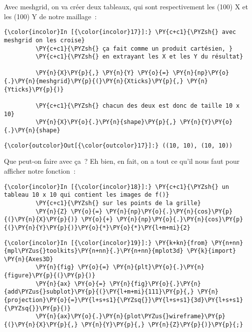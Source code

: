     Avec meshgrid, on va créer deux tableaux, qui sont respectivement les
(100) X et les (100) Y de notre maillage~:

    \begin{Verbatim}[commandchars=\\\{\},frame=single,framerule=0.3mm,rulecolor=\color{cellframecolor}]
{\color{incolor}In [{\color{incolor}17}]:} \PY{c+c1}{\PYZsh{} avec meshgrid on les croise}
         \PY{c+c1}{\PYZsh{} ça fait comme un produit cartésien, }
         \PY{c+c1}{\PYZsh{} en extrayant les X et les Y du résultat}
         
         \PY{n}{X}\PY{p}{,} \PY{n}{Y} \PY{o}{=} \PY{n}{np}\PY{o}{.}\PY{n}{meshgrid}\PY{p}{(}\PY{n}{Xticks}\PY{p}{,} \PY{n}{Yticks}\PY{p}{)}
         
         \PY{c+c1}{\PYZsh{} chacun des deux est donc de taille 10 x 10}
         \PY{n}{X}\PY{o}{.}\PY{n}{shape}\PY{p}{,} \PY{n}{Y}\PY{o}{.}\PY{n}{shape}
\end{Verbatim}


\begin{Verbatim}[commandchars=\\\{\},frame=single,framerule=0.3mm,rulecolor=\color{cellframecolor}]
{\color{outcolor}Out[{\color{outcolor}17}]:} ((10, 10), (10, 10))
\end{Verbatim}
            
    Que peut-on faire avec ça~? Eh bien, en fait, on a tout ce qu'il nous
faut pour afficher notre fonction~:

    \begin{Verbatim}[commandchars=\\\{\},frame=single,framerule=0.3mm,rulecolor=\color{cellframecolor}]
{\color{incolor}In [{\color{incolor}18}]:} \PY{c+c1}{\PYZsh{} un tableau 10 x 10 qui contient les images de f()}
         \PY{c+c1}{\PYZsh{} sur les points de la grille}
         \PY{n}{Z} \PY{o}{=} \PY{n}{np}\PY{o}{.}\PY{n}{cos}\PY{p}{(}\PY{n}{X}\PY{p}{)} \PY{o}{+} \PY{n}{np}\PY{o}{.}\PY{n}{cos}\PY{p}{(}\PY{n}{Y}\PY{p}{)}\PY{o}{*}\PY{o}{*}\PY{l+m+mi}{2}
\end{Verbatim}


    \begin{Verbatim}[commandchars=\\\{\},frame=single,framerule=0.3mm,rulecolor=\color{cellframecolor}]
{\color{incolor}In [{\color{incolor}19}]:} \PY{k+kn}{from} \PY{n+nn}{mpl\PYZus{}toolkits}\PY{n+nn}{.}\PY{n+nn}{mplot3d} \PY{k}{import} \PY{n}{Axes3D}
         \PY{n}{fig} \PY{o}{=} \PY{n}{plt}\PY{o}{.}\PY{n}{figure}\PY{p}{(}\PY{p}{)}
         \PY{n}{ax} \PY{o}{=} \PY{n}{fig}\PY{o}{.}\PY{n}{add\PYZus{}subplot}\PY{p}{(}\PY{l+m+mi}{111}\PY{p}{,} \PY{n}{projection}\PY{o}{=}\PY{l+s+s1}{\PYZsq{}}\PY{l+s+s1}{3d}\PY{l+s+s1}{\PYZsq{}}\PY{p}{)}
         \PY{n}{ax}\PY{o}{.}\PY{n}{plot\PYZus{}wireframe}\PY{p}{(}\PY{n}{X}\PY{p}{,} \PY{n}{Y}\PY{p}{,} \PY{n}{Z}\PY{p}{)}\PY{p}{;}
\end{Verbatim}


